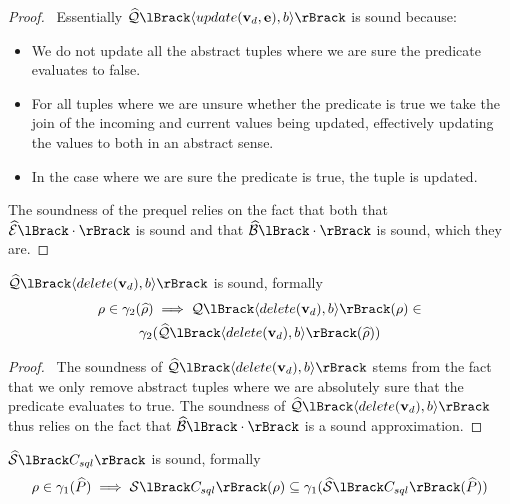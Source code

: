 \begin{proof}
    \pfsketch\
    Essentially $\abssqlsem{\langle update(\absattrs, \absexps), b \rangle}$ is sound because:
    \begin{itemize}
        \item We do not update all the abstract tuples where we are sure the predicate evaluates to false.
        \item For all tuples where we are unsure whether the predicate is true we take the join of the incoming and current values being updated, effectively updating the values to both in an abstract sense.
        \item In the case where we are sure the predicate is true, the tuple is updated.
    \end{itemize}
    The soundness of the prequel relies on the fact that both that $\absexpsem{\cdot}$ is sound and that $\absboolsem{\cdot}$ is sound, which they are.
\end{proof}


\begin{conjecture}
    \label{thm:sound-delete}
    $\abssqlsem{\langle delete(\absattrs), b \rangle}$ is sound, formally
    \begin{multline*}
        \environment \in \concrete_2(\ab{\environment}) \implies \sqlsem{\langle delete(\absattrs), b \rangle}(\environment) \in \\
        \concrete_2(\abssqlsem{\langle delete(\absattrs), b \rangle}(\ab{\environment}))
    \end{multline*}
\end{conjecture}


\begin{proof}
    \pfsketch\
    The soundness of $\abssqlsem{\langle delete(\absattrs), b \rangle}$ stems from the fact that we only remove abstract tuples where we are absolutely sure that the predicate evaluates to true.
    The soundness of $\abssqlsem{\langle delete(\absattrs), b \rangle}$ thus relies on the fact that $\absboolsem{\cdot}$ is a sound approximation.
\end{proof}


\begin{conjecture}
    \label{thm:sound-sql}
    $\abssem{C_{sql}}$ is sound, formally
    \begin{equation*}
    \environment \in \concrete_1(\ab{P}) \implies \sem{C_{sql}}(\environment) \subseteq \concrete_1(\abssem{C_{sql}}(\ab{P}))
    \end{equation*}
\end{conjecture}


